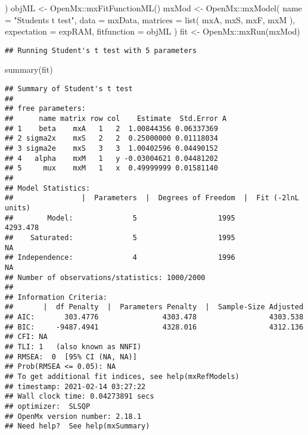 \documentclass[
]{book}
\newenvironment{Shaded}{\begin{snugshade}}{\end{snugshade}}
\newcommand{\AttributeTok}[1]{\textcolor[rgb]{0.77,0.63,0.00}{#1}}
\newcommand{\FunctionTok}[1]{\textcolor[rgb]{0.00,0.00,0.00}{#1}}
\newcommand{\NormalTok}[1]{#1}
\newcommand{\OtherTok}[1]{\textcolor[rgb]{0.56,0.35,0.01}{#1}}
\newcommand{\SpecialCharTok}[1]{\textcolor[rgb]{0.00,0.00,0.00}{#1}}
\newcommand{\StringTok}[1]{\textcolor[rgb]{0.31,0.60,0.02}{#1}}
\theoremstyle{definition}
\theoremstyle{definition}
\theoremstyle{definition}
\theoremstyle{remark}
\begin{document}
\begin{Shaded}
\begin{Highlighting}[]
\NormalTok{)}
\NormalTok{objML }\OtherTok{\textless{}{-}}\NormalTok{ OpenMx}\SpecialCharTok{::}\FunctionTok{mxFitFunctionML}\NormalTok{()}
\NormalTok{mxMod }\OtherTok{\textless{}{-}}\NormalTok{ OpenMx}\SpecialCharTok{::}\FunctionTok{mxModel}\NormalTok{(}
  \AttributeTok{name =} \StringTok{"Student\textquotesingle{}s t test"}\NormalTok{,}
  \AttributeTok{data =}\NormalTok{ mxData,}
  \AttributeTok{matrices =} \FunctionTok{list}\NormalTok{(}
\NormalTok{    mxA,}
\NormalTok{    mxS,}
\NormalTok{    mxF,}
\NormalTok{    mxM}
\NormalTok{  ),}
  \AttributeTok{expectation =}\NormalTok{ expRAM,}
  \AttributeTok{fitfunction =}\NormalTok{ objML}
\NormalTok{)}
\NormalTok{fit }\OtherTok{\textless{}{-}}\NormalTok{ OpenMx}\SpecialCharTok{::}\FunctionTok{mxRun}\NormalTok{(mxMod)}
\end{Highlighting}
\end{Shaded}

\begin{verbatim}
## Running Student's t test with 5 parameters
\end{verbatim}

\begin{Shaded}
\begin{Highlighting}[]
\FunctionTok{summary}\NormalTok{(fit)}
\end{Highlighting}
\end{Shaded}

\begin{verbatim}
## Summary of Student's t test 
##  
## free parameters:
##      name matrix row col    Estimate  Std.Error A
## 1    beta    mxA   1   2  1.00844356 0.06337369  
## 2 sigma2x    mxS   2   2  0.25000000 0.01118034  
## 3 sigma2e    mxS   3   3  1.00402596 0.04490152  
## 4   alpha    mxM   1   y -0.03004621 0.04481202  
## 5     mux    mxM   1   x  0.49999999 0.01581140  
## 
## Model Statistics: 
##                |  Parameters  |  Degrees of Freedom  |  Fit (-2lnL units)
##        Model:              5                   1995              4293.478
##    Saturated:              5                   1995                    NA
## Independence:              4                   1996                    NA
## Number of observations/statistics: 1000/2000
## 
## Information Criteria: 
##       |  df Penalty  |  Parameters Penalty  |  Sample-Size Adjusted
## AIC:       303.4776               4303.478                 4303.538
## BIC:     -9487.4941               4328.016                 4312.136
## CFI: NA 
## TLI: 1   (also known as NNFI) 
## RMSEA:  0  [95% CI (NA, NA)]
## Prob(RMSEA <= 0.05): NA
## To get additional fit indices, see help(mxRefModels)
## timestamp: 2021-02-14 03:27:22 
## Wall clock time: 0.04273891 secs 
## optimizer:  SLSQP 
## OpenMx version number: 2.18.1 
## Need help?  See help(mxSummary)
\end{verbatim}
\end{document}

